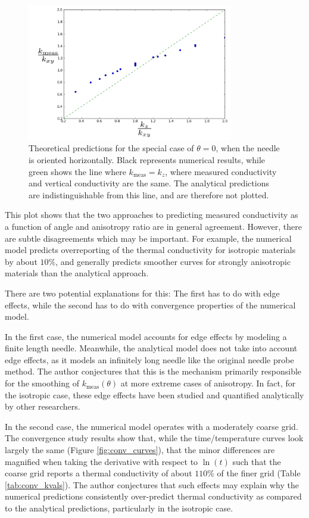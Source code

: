 \begin{figure}[h]
\centering
\includegraphics[width=0.8\textwidth]{fig/angle_0.png}
\caption{Theoretical predictions for the special case of \(\theta = 0 \),
when the needle is oriented horizontally. Black represents numerical results, while green shows the line where \(k_{\textrm{meas}} = k_z\), where measured conductivity and vertical conductivity are the same. The analytical predictions are indistinguishable from this line, and are therefore not plotted.}
\label{fig:angle0}
\end{figure}


This plot shows that the two approaches to predicting measured conductivity
as a function of angle and anisotropy ratio are in general agreement. However,
there are subtle disagreements which may be important. For example, the
numerical model predicts overreporting of the thermal conductivity for
isotropic materials by about \(10\%\), and generally predicts smoother
curves for strongly anisotropic materials than the analytical approach.

There are two potential explanations for this: The first has to do with edge
effects, while the second has to do with convergence properties of the numerical
model.

In the first case, the numerical model accounts for edge effects by
modeling a finite length needle. Meanwhile, the analytical model does not take
into account edge effects, as it models an infinitely long needle like the
original needle probe method. The author conjectures that this is the mechanism
primarily responsible for the smoothing of \(k_{\textrm{meas}}(\theta)\) at more extreme
cases of anisotropy. In fact, for the isotropic case, these edge effects have
been studied and quantified analytically by other researchers. \cite{axialerror}


In the second case, the numerical model operates with a moderately coarse grid.
The convergence study results show that, while the time/temperature curves look
largely the same (Figure \ref{fig:conv_curves}), that the minor differences are magnified when taking the
derivative with respect to \(\ln(t)\) such that the coarse grid reports a
thermal conductivity of about \(110\%\) of the finer grid (Table \ref{tab:conv_kvals}). The author
conjectures that such effects may explain why the numerical predictions
consistently over-predict thermal conductivity as compared to the analytical
predictions, particularly in the isotropic case.



